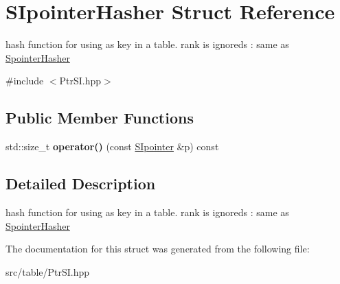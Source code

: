 \hypertarget{structSIpointerHasher}{}\section{S\+Ipointer\+Hasher Struct Reference}
\label{structSIpointerHasher}


hash function for using as key in a table. rank is ignoreds \+: same as \mbox{\hyperlink{structSpointerHasher}{Spointer\+Hasher}}  




{\ttfamily \#include $<$Ptr\+S\+I.\+hpp$>$}

\subsection*{Public Member Functions}
\begin{DoxyCompactItemize}
\item 
\mbox{\label{structSIpointerHasher_ad3858671072869f875338fd56bf3cc82}} 
std\+::size\+\_\+t {\bfseries operator()} (const \mbox{\hyperlink{classSIpointer}{S\+Ipointer}} \&p) const
\end{DoxyCompactItemize}


\subsection{Detailed Description}
hash function for using as key in a table. rank is ignoreds \+: same as \mbox{\hyperlink{structSpointerHasher}{Spointer\+Hasher}} 

The documentation for this struct was generated from the following file\+:\begin{DoxyCompactItemize}
\item 
src/table/Ptr\+S\+I.\+hpp\end{DoxyCompactItemize}
